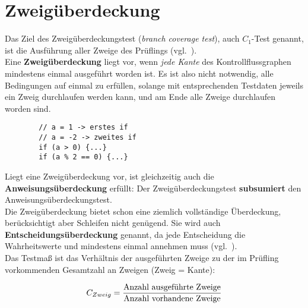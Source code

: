 \section{Zweigüberdeckung}


\begin{tcolorbox}[title={Zweigüberdeckung ($C_1$-Test)}]
    Das Ziel des Zweigüberdeckungstest (\textit{branch coverage test}), auch $C_1$-Test genannt, ist die Ausführung aller Zweige des Prüflings  (vgl.~\cite[88]{Lig09a}).\\

    Eine \textbf{Zweigüberdeckung} liegt vor, wenn \textit{jede Kante} des Kontrollflussgraphen mindestens einmal ausgeführt worden ist.
    Es ist also nicht notwendig, alle Bedingungen auf einmal zu erfüllen, solange mit entsprechenden Testdaten jeweils ein Zweig durchlaufen werden kann, und am Ende alle Zweige durchlaufen worden sind.
    \begin{verbatim}
        // a = 1 -> erstes if
        // a = -2 -> zweites if
        if (a > 0) {...}
        if (a % 2 == 0) {...}
    \end{verbatim}
    Liegt eine Zweigüberdeckung vor, ist gleichzeitig auch die \textbf{Anweisungsüberdeckung} erfüllt: Der Zweigüberdeckungstest \textbf{subsumiert} den Anweisungsüberdeckungstest.\\

    \noindent
    Die Zweigüberdeckung bietet schon eine ziemlich vollständige Überdeckung, berücksichtigt aber Schleifen nicht genügend.
    Sie wird auch \textbf{Entscheidungsüberdeckung} genannt, da jede Entscheidung die Wahrheitswerte  und  mindestens einmal annehmen muss (vgl.~\cite[404]{Bal97}).\\


    \noindent
    Das Testmaß ist das Verhältnis der ausgeführten Zweige zu der im Prüfling vorkommenden Gesamtzahl an Zweigen (Zweig = Kante):

    \begin{equation}\notag
    C_{Zweig} = \frac{\text{Anzahl ausgeführte Zweige}}{\text{Anzahl vorhandene Zweige}}
    \end{equation}
\end{tcolorbox}